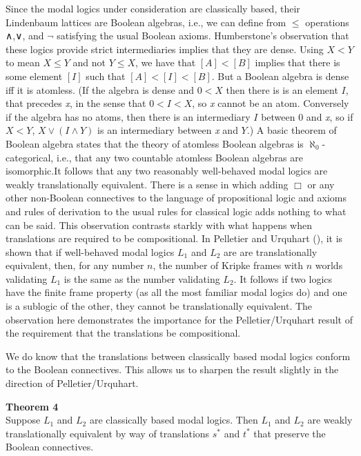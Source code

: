 \documentclass[
  11pt,
  letterpaper,
  DIV=11,
  numbers=noendperiod,
  twoside]{scrartcl}
\begin{document}
Since the modal logics under consideration are classically based, their
Lindenbaum lattices are Boolean algebras, i.e., we can define from
\(\le\) operations ∧,∨, and \(\neg\) satisfying the usual Boolean
axioms. Humberstone's observation that these logics provide strict
intermediaries implies that they are dense. Using \(X{<}Y\) to mean
\(X\le Y\) and not \(Y\le X\), we have that \([A]{<}[B]\) implies that
there is some element \([I]\) such that \([A]{<}[I]{<}[B]\). But a
Boolean algebra is dense iff it is atomless. (If the algebra is dense
and \(0{<}X\) then there is is an element \(I\), that precedes \emph{x},
in the sense that \(0{<}I{<}X\), so \emph{x} cannot be an atom.
Conversely if the algebra has no atoms, then there is an intermediary
\(I\) between \(0\) and \emph{x}, so if \(X{<}Y\), \(X\vee (I\wedge Y)\)
is an intermediary between \emph{x} and \(Y\).) A basic theorem of
Boolean algebra states that the theory of atomless Boolean algebras is
\(\aleph_0\)-categorical, i.e., that any two countable atomless Boolean
algebras are isomorphic.It follows that any two reasonably well-behaved
modal logics are weakly translationally equivalent. There is a sense in
which adding \(\Box\) or any other non-Boolean connectives to the
language of propositional logic and axioms and rules of derivation to
the usual rules for classical logic adds nothing to what can be said.
This observation contrasts starkly with what happens when translations
are required to be compositional. In Pelletier and Urquhart
(), it is shown that if
well-behaved modal logics \(L_1\) and \(L_2\) are are translationally
equivalent, then, for any number \(n\), the number of Kripke frames with
\(n\) worlds validating \(L_1\) is the same as the number validating
\(L_2\). It follows if two logics have the finite frame property (as all
the most familiar modal logics do) and one is a sublogic of the other,
they cannot be translationally equivalent. The observation here
demonstrates the importance for the Pelletier/Urquhart result of the
requirement that the translations be compositional.

We do know that the translations between classically based modal logics
conform to the Boolean connectives. This allows us to sharpen the result
slightly in the direction of Pelletier/Urquhart.

\textbf{Theorem 4}\\
Suppose \(L_1\) and \(L_2\) are classically based modal logics. Then
\(L_1\) and \(L_2\) are weakly translationally equivalent by way of
translations \(s^*\) and \(t^*\) that preserve the Boolean connectives.
\end{document}
